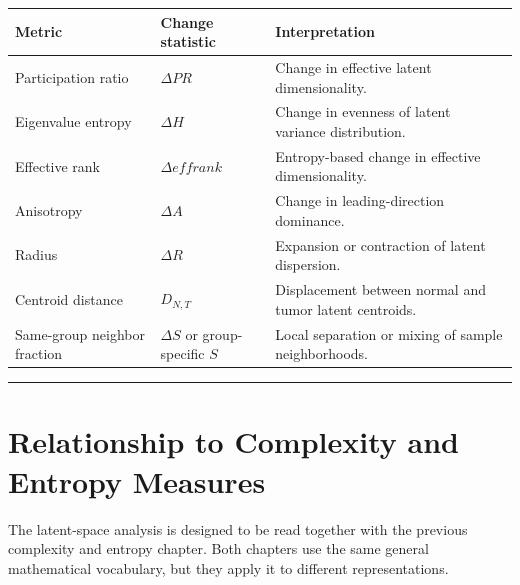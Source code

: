 \documentclass[
  letterpaper,
  DIV=11,
  numbers=noendperiod,
  openany,
  oneside]{scrreprt}
\begin{document}
\begin{longtable}[]{@{}
  >{\raggedright\arraybackslash}p{}
  >{\raggedright\arraybackslash}p{}
  >{\raggedright\arraybackslash}p{}@{}}
\toprule\noalign{}
\begin{minipage}[b]{\linewidth}\raggedright
Metric
\end{minipage} & \begin{minipage}[b]{\linewidth}\raggedright
Change statistic
\end{minipage} & \begin{minipage}[b]{\linewidth}\raggedright
Interpretation
\end{minipage} \\
\midrule\noalign{}
\endhead
\bottomrule\noalign{}
\endlastfoot
Participation ratio & \(\Delta PR\) & Change in effective latent
dimensionality. \\
Eigenvalue entropy & \(\Delta H\) & Change in evenness of latent
variance distribution. \\
Effective rank & \(\Delta effrank\) & Entropy-based change in effective
dimensionality. \\
Anisotropy & \(\Delta A\) & Change in leading-direction dominance. \\
Radius & \(\Delta R\) & Expansion or contraction of latent
dispersion. \\
Centroid distance & \(D_{N,T}\) & Displacement between normal and tumor
latent centroids. \\
Same-group neighbor fraction & \(\Delta S\) or group-specific \(S\) &
Local separation or mixing of sample neighborhoods. \\
\end{longtable}

\begin{center}\rule{0.5\linewidth}{0.5pt}\end{center}

\section{Relationship to Complexity and Entropy
Measures}\label{relationship-to-complexity-and-entropy-measures}

The latent-space analysis is designed to be read together with the
previous complexity and entropy chapter. Both chapters use the same
general mathematical vocabulary, but they apply it to different
representations.
\end{document}
